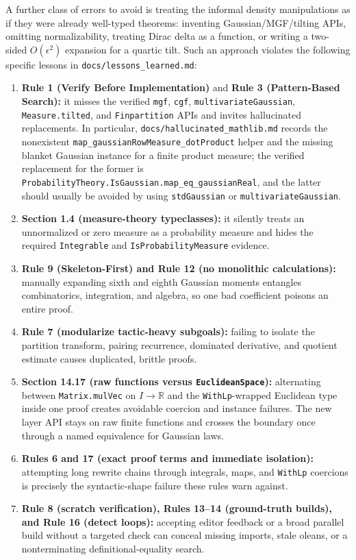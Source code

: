 A further class of errors to avoid is treating the informal density manipulations as if they were
already well-typed theorems: inventing Gaussian/MGF/tilting APIs, omitting normalizability, treating
Dirac delta as a function, or writing a two-sided $O(\epsilon^2)$ expansion for a quartic tilt.  Such
an approach violates the following specific lessons in \texttt{docs/lessons\_learned.md}:
\begin{enumerate}
  \item \textbf{Rule 1 (Verify Before Implementation)} and \textbf{Rule 3 (Pattern-Based Search):}
    it misses the verified \texttt{mgf}, \texttt{cgf}, \texttt{multivariateGaussian},
    \texttt{Measure.tilted}, and \texttt{Finpartition} APIs and invites hallucinated replacements.
    In particular, \texttt{docs/hallucinated\_mathlib.md} records the nonexistent
    \texttt{map\_gaussianRowMeasure\_dotProduct} helper and the missing blanket Gaussian instance
    for a finite product measure; the verified replacement for the former is
    \texttt{ProbabilityTheory.IsGaussian.map\_eq\_gaussianReal}, and the latter should usually be
    avoided by using \texttt{stdGaussian} or \texttt{multivariateGaussian}.
  \item \textbf{Section 1.4 (measure-theory typeclasses):} it silently treats an unnormalized or
    zero measure as a probability measure and hides the required \texttt{Integrable} and
    \texttt{IsProbabilityMeasure} evidence.
  \item \textbf{Rule 9 (Skeleton-First) and Rule 12 (no monolithic calculations):} manually
    expanding sixth and eighth Gaussian moments entangles combinatorics, integration, and algebra,
    so one bad coefficient poisons an entire proof.
  \item \textbf{Rule 7 (modularize tactic-heavy subgoals):} failing to isolate the partition
    transform, pairing recurrence, dominated derivative, and quotient estimate causes duplicated,
    brittle proofs.
  \item \textbf{Section 14.17 (raw functions versus \texttt{EuclideanSpace}):} alternating between
    \texttt{Matrix.mulVec} on $I\to\mathbb R$ and the \texttt{WithLp}-wrapped Euclidean type inside
    one proof creates avoidable coercion and instance failures.  The new layer API stays on raw
    finite functions and crosses the boundary once through a named equivalence for Gaussian laws.
  \item \textbf{Rules 6 and 17 (exact proof terms and immediate isolation):} attempting long
    rewrite chains through integrals, maps, and \texttt{WithLp} coercions is precisely the
    syntactic-shape failure these rules warn against.
  \item \textbf{Rule 8 (scratch verification), Rules 13--14 (ground-truth builds), and Rule 16
    (detect loops):} accepting editor feedback or a broad parallel build without a targeted check
    can conceal missing imports, stale oleans, or a nonterminating definitional-equality search.
\end{enumerate}

